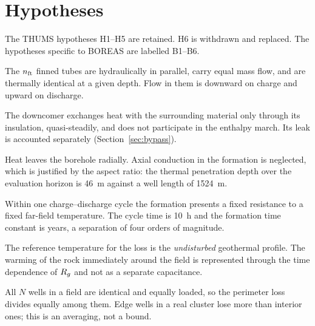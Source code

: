 \section{Hypotheses}

The THUMS hypotheses H1--H5 are retained. H6 is withdrawn and replaced. The
hypotheses specific to BOREAS are labelled B1--B6.

\begin{description}[leftmargin=2.2em,style=nextline]
\item[B1 --- Parallel downward tubes.] The $n_{\mathrm{ft}}$ finned tubes are
hydraulically in parallel, carry equal mass flow, and are thermally identical
at a given depth. Flow in them is downward on charge and upward on discharge.
\item[B2 --- Non-exchanging downcomer.] The downcomer exchanges heat with the
surrounding material only through its insulation, quasi-steadily, and does not
participate in the enthalpy march. Its leak is accounted separately
(Section~\ref{sec:bypass}).
\item[B3 --- One-dimensional formation path.] Heat leaves the borehole
radially. Axial conduction in the formation is neglected, which is justified
by the aspect ratio: the thermal penetration depth over the evaluation horizon
is \SI{46}{\metre} against a well length of \SI{1524}{\metre}.
\item[B4 --- Quasi-steady ground.] Within one charge--discharge cycle the
formation presents a fixed resistance to a fixed far-field temperature. The
cycle time is \SI{10}{\hour} and the formation time constant is years, a
separation of four orders of magnitude.
\item[B5 --- Undisturbed far field.] The reference temperature for the loss is
the \emph{undisturbed} geothermal profile. The warming of the rock immediately
around the field is represented through the time dependence of $R_{g}$ and not
as a separate capacitance.
\item[B6 --- Uniform cluster.] All $N$ wells in a field are identical and
equally loaded, so the perimeter loss divides equally among them. Edge wells
in a real cluster lose more than interior ones; this is an averaging, not a
bound.
\end{description}

